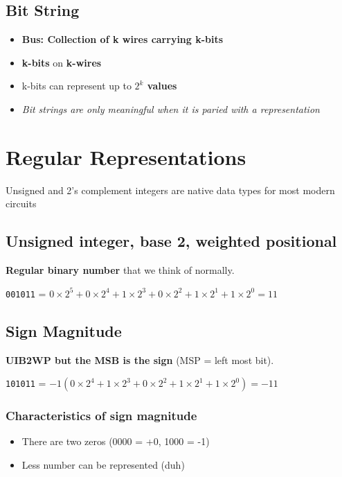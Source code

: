 \documentclass[11pt]{article}
\begin{document}
\subsection{Bit String}
\label{sec:orge795f23}

\begin{itemize}
\item \textbf{Bus: Collection of k wires carrying k-bits}
\item \textbf{k-bits} on \textbf{k-wires}
\item k-bits can represent up to \textbf{\(2^k\) values}
\item \emph{Bit strings are only meaningful when it is paried with a representation}
\end{itemize}

\section{Regular Representations}
\label{sec:org8fe1875}

Unsigned and 2's complement integers are native data types for most modern circuits

\subsection{Unsigned integer, base 2, weighted positional}
\label{sec:org8d5d100}

\textbf{Regular binary number} that we think of normally.

\texttt{001011} = \(0 \times 2^5 + 0 \times 2^4 + 1 \times 2^3 + 0 \times 2^2 + 1 \times 2^1 + 1 \times 2^0 = 11\)

\subsection{Sign Magnitude}
\label{sec:orgb9c460a}

\textbf{UIB2WP but the MSB is the sign} (MSP = left most bit).

\texttt{101011} = \(-1(0 \times 2^4 + 1 \times 2^3 + 0 \times 2^2 + 1 \times 2^1 + 1 \times 2^0) = -11\)

\subsubsection{Characteristics of sign magnitude}
\label{sec:org6791e67}

\begin{itemize}
\item There are two zeros (0000 = +0, 1000 = -1)
\item Less number can be represented (duh)
\end{itemize}
\end{document}
